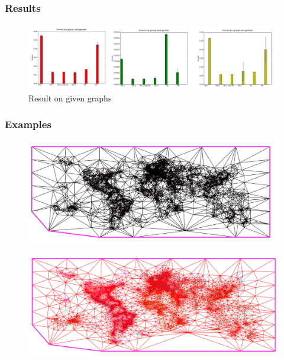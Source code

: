 \begin{frame}
\frametitle{Results}
\framesubtitle{}
\begin{exampleblock}{}
\begin{figure}[!h]
\centering
\includegraphics[scale=0.4]{../rapport/img/histo.png}
\caption{Result on given graphs}
\end{figure}
\end{exampleblock}{}
\end{frame}

\begin{frame}
\frametitle{Examples}
\begin{exampleblock}{}
\begin{figure}[!h]
\centering
\includegraphics[scale=0.2]{../rapport/img/aiir_traffic_origin.png}
\end{figure}
\end{exampleblock}{}
\pause
\begin{exampleblock}{}
\begin{figure}[!h]
\centering
\includegraphics[scale=0.2]{../rapport/img/aiir_traffic_tutted.png}
\end{figure}
\end{exampleblock}{}
\end{frame}

